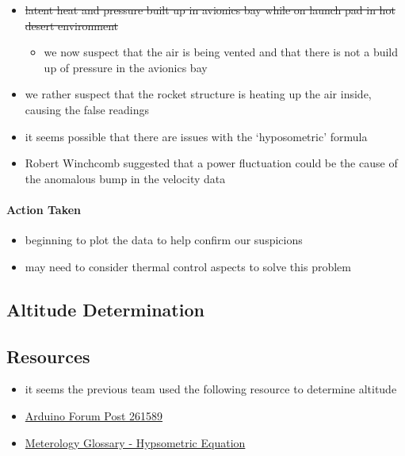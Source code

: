 \documentclass[]{article}
\providecommand{\tightlist}{%
  \setlength{\itemsep}{0pt}\setlength{\parskip}{0pt}}
\let\oldparagraph\paragraph
\renewcommand{\paragraph}[1]{\oldparagraph{#1}\mbox{}}
\begin{document}
\begin{itemize}
\tightlist
\item
  \sout{latent heat and pressure built up in avionics bay while on
  launch pad in hot desert environment}

  \begin{itemize}
  \tightlist
  \item
    we now suspect that the air is being vented and that there is not a
    build up of pressure in the avionics bay
  \end{itemize}
\item
  we rather suspect that the rocket structure is heating up the air
  inside, causing the false readings
\item
  it seems possible that there are issues with the `hyposometric'
  formula
\item
  Robert Winchcomb suggested that a power fluctuation could be the cause
  of the anomalous bump in the velocity data
\end{itemize}

\paragraph{Action Taken}\label{action-taken}

\begin{itemize}
\tightlist
\item
  beginning to plot the data to help confirm our suspicions
\item
  may need to consider thermal control aspects to solve this problem
\end{itemize}

\clearpage

\subsection{Altitude Determination}\label{altitude-determination}

\subsection{Resources}\label{resources}

\begin{itemize}
\tightlist
\item
  it seems the previous team used the following resource to determine
  altitude
\item
  \href{http://forum.arduino.cc/index.php?topic=261589.0}{Arduino Forum
  Post 261589}
\item
  \href{http://glossary.ametsoc.org/wiki/Hypsometric_equation}{Meterology
  Glossary - Hypsometric Equation}
\end{itemize}
\end{document}
